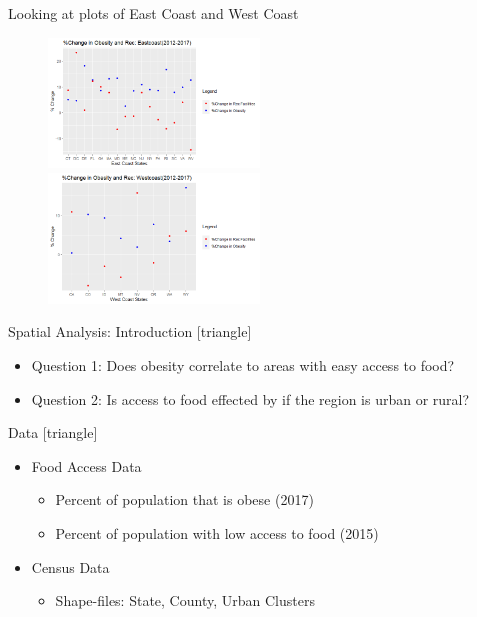 \documentclass{beamer} %
\begin{document}
\begin{frame}{Looking at plots of East Coast and West Coast}
  \begin{figure}
   \includegraphics[width=0.5\textwidth]{Eastplot.png}
   \hfill
   \includegraphics[width=0.5\textwidth]{Westplot.png}
  \end{figure}
\end{frame}




\begin{frame}{Spatial Analysis: Introduction}
[triangle]
  \begin{itemize}
  \item Question 1: Does obesity correlate to areas with easy access to food?
  \item Question 2: Is access to food effected by if the region is urban or rural?
  \end{itemize}
\end{frame}

\begin{frame}{Data}
[triangle]
\begin{itemize}
  \item Food Access Data
    \begin{itemize}
        \item Percent of population that is obese (2017)
        \item Percent of population with low access to food (2015)
    \end{itemize}
    \item Census Data
        \begin{itemize}
            \item Shape-files: State, County, Urban Clusters
        \end{itemize}
\end{itemize}
\end{frame}
\end{document}
